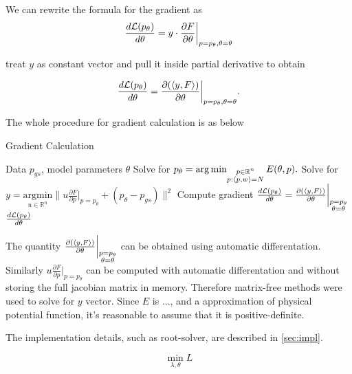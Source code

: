 \documentclass[a4paper,10pt]{report}
\begin{document}
We can rewrite the formula for the gradient as
\begin{equation}
 \frac{d\mathcal{L}(p_\theta)}{d \theta} = y \cdot  \frac{\partial F}{\partial \theta}\bigg|_{p=p_\theta, \theta=\theta}
\end{equation}

treat $y$ as constant vector and pull it inside partial derivative to obtain


\begin{equation}
 \frac{d\mathcal{L}(p_\theta)}{d \theta} =   \frac{\partial (\langle y, F \rangle)}{\partial \theta}\bigg|_{p=p_\theta, \theta=\theta}.
\end{equation}



The whole procedure for gradient calculation is as below
\begin{algorithm}[H]
\caption{Gradient Calculation}
\begin{algorithmic}[1]
\Require Data $p_{gs}$, model parameters $\theta$
\State  Solve for $p_\theta  = \operatorname*{arg\,min}_{\substack{p \in \mathbb{R}^n \\ p: \langle p, w \rangle=N }} E(\theta, p).$
\State Solve for $y = \underset{u\in \mathbb{R}^n}{\mathrm{argmin}} \bigg\|u \frac{\partial F}{\partial p}\bigg|_{p=p_\theta} + (p_\theta-p_{gs})\bigg\|^2$
\State Compute gradient $\frac{d\mathcal{L}(p_\theta)}{d \theta} = \frac{\partial (\langle y, F \rangle)}{\partial \theta}\bigg|_{\substack{p=p_\theta \\\theta= \theta}}$
\State \Return $\frac{d\mathcal{L}(p_\theta)}{d \theta}$
\end{algorithmic}
\end{algorithm}


The quantity $\frac{\partial (\langle y, F \rangle)}{\partial \theta}\bigg|_{\substack{p=p_\theta \\\theta= \theta}}$ can be obtained using automatic differentation.  Similarly $u \frac{\partial F}{\partial p}\bigg|_{p=p_\theta}$ can be computed with automatic differentation and without storing the full jacobian matrix in memory. Therefore matrix-free methods were used to solve for $y$ vector. Since $E$ is ..., and a approximation of physical potential function, it's reasonable to assume that it is positive-definite.


The implementation details, such as root-solver, are described in \ref{sec:impl}.



 \begin{equation}
\min_{\lambda,\theta} L
 \end{equation}
\end{document}
